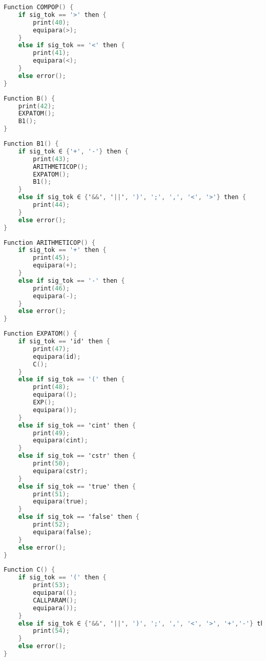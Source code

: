 \begin{lstlisting}[language=C, caption={COMPOP}]
Function COMPOP() {
    if sig_tok == '>' then {
        print(40);
        equipara(>);
    }
    else if sig_tok == '<' then {
        print(41);
        equipara(<);
    }
    else error();
}
\end{lstlisting}

\begin{lstlisting}[language=C, caption={B}]
Function B() {
    print(42);
    EXPATOM();
    B1();
}
\end{lstlisting}

\begin{lstlisting}[language=C, caption={B1}]
Function B1() {
    if sig_tok ∈ {'+', '-'} then {
        print(43);
        ARITHMETICOP();
        EXPATOM();
        B1();
    }
    else if sig_tok ∈ {'&&', '||', ')', ';', ',', '<', '>'} then {
        print(44);
    }
    else error();
}
\end{lstlisting}

\begin{lstlisting}[language=C, caption={ARITHMETICOP}]
Function ARITHMETICOP() {
    if sig_tok == '+' then {
        print(45);
        equipara(+);
    }
    else if sig_tok == '-' then {
        print(46);
        equipara(-);
    }
    else error();
}
\end{lstlisting}

\begin{lstlisting}[language=C, caption={EXPATOM}]
Function EXPATOM() {
    if sig_tok == 'id' then {
        print(47);
        equipara(id);
        C();
    }
    else if sig_tok == '(' then {
        print(48);
        equipara(();
        EXP();
        equipara());
    }
    else if sig_tok == 'cint' then {
        print(49);
        equipara(cint);
    }
    else if sig_tok == 'cstr' then {
        print(50);
        equipara(cstr);
    }
    else if sig_tok == 'true' then {
        print(51);
        equipara(true);
    }
    else if sig_tok == 'false' then {
        print(52);
        equipara(false);
    }
    else error();
}
\end{lstlisting}
\newpage
\begin{lstlisting}[language=C, caption={C}]
Function C() {
    if sig_tok == '(' then {
        print(53);
        equipara(();
        CALLPARAM();
        equipara());
    }
    else if sig_tok ∈ {'&&', '||', ')', ';', ',', '<', '>', '+','-'} then {
        print(54);
    }
    else error();
}
\end{lstlisting}
